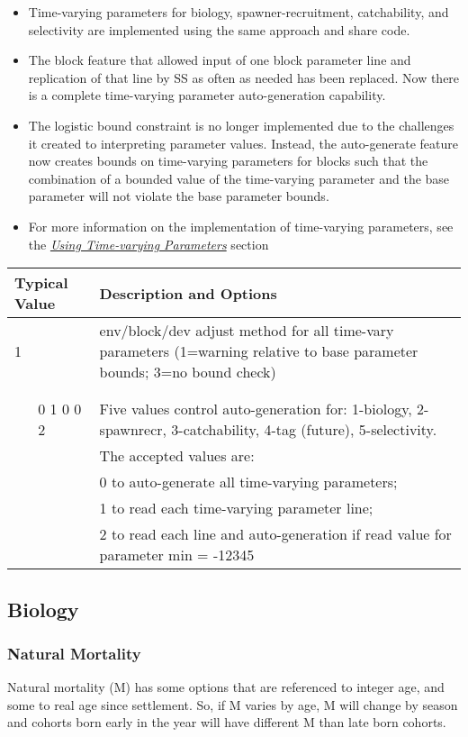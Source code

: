 \begin{itemize}
  \item	Time-varying parameters for biology, spawner-recruitment, catchability, and selectivity are implemented using the same approach and share code.
  \item The block feature that allowed input of one block parameter line and replication of that line by SS as often as needed has been replaced.  Now there is a complete time-varying parameter auto-generation capability.
  \item The logistic bound constraint is no longer implemented due to the challenges it created to interpreting parameter values.  Instead, the auto-generate feature now creates bounds on time-varying parameters for blocks such that the combination of a bounded  value of the time-varying parameter and the base parameter will not violate the base parameter bounds.
  \item For more information on the implementation of time-varying parameters, see the \hyperlink{TVpara}{\textit{Using Time-varying Parameters}} section
\end{itemize}	
	

\begin{longtable}{p{0.5cm} p{2cm} p{12cm}}
     \multicolumn{2}{l}{Typical Value} & Description and Options\\
     \hline
	 1 & & \multirow{1}{6cm}[-0.1cm]{\parbox{12cm}{env/block/dev adjust method for all time-vary parameters (1=warning relative to base parameter bounds; 3=no bound check)}}
	\\ \\ \\
	& 0 1 0 0 2 & Five values control auto-generation for:  1-biology, 2-spawnrecr, 3-catchability, 4-tag (future), 5-selectivity.\\
	&			& The accepted values are:\\
	&           & 0 to auto-generate all time-varying parameters;\\
	& 			& 1 to read each time-varying parameter line;\\
	&			& 2 to read each line and auto-generation if read value for parameter min = -12345 \\
	\hline
\end{longtable}


\subsection{Biology}
\subsubsection{Natural Mortality}
Natural mortality (M) has some options that are referenced to integer age, and some to real age since settlement.  So, if M varies by age, M will change by season and cohorts born  early in the year will have different M than late born cohorts.

